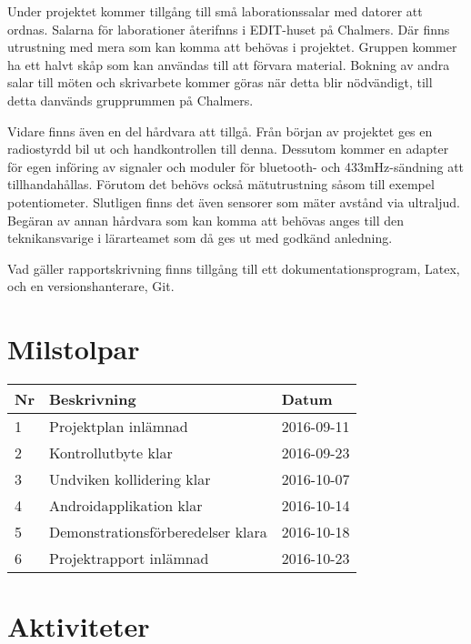 \documentclass[a4paper]{article}
\begin{document}
\vspace{5mm}
\noindent Under projektet kommer tillgång till små laborationssalar med datorer att ordnas. Salarna för laborationer återifnns i EDIT-huset på Chalmers. Där finns utrustning med mera som kan komma att behövas i projektet. Gruppen kommer ha ett halvt skåp som kan användas till att förvara material. Bokning av andra salar till möten och skrivarbete kommer göras när detta blir nödvändigt, till detta danvänds grupprummen på Chalmers.

Vidare finns även en del hårdvara att tillgå. Från början av projektet ges en radiostyrdd bil ut och handkontrollen till denna. Dessutom kommer en adapter för egen införing av signaler och moduler för bluetooth- och 433mHz-sändning att tillhandahållas. Förutom det behövs också mätutrustning såsom till exempel potentiometer. Slutligen finns det även sensorer som mäter avstånd via ultraljud. Begäran av annan hårdvara som kan komma att behövas anges till den teknikansvarige i lärarteamet som då ges ut med godkänd anledning.
 
Vad gäller rapportskrivning finns tillgång till ett dokumentationsprogram, Latex, och en versionshanterare, Git. 

\section{Milstolpar}

\begin{tabular}{|l|l|l|} \hline
\bf Nr & \bf Beskrivning & \bf Datum \\ \hline \hline
1 & Projektplan inlämnad & 2016-09-11 \\\hline
2 & Kontrollutbyte klar & 2016-09-23 \\ \hline
3 & Undviken kollidering klar & 2016-10-07 \\ \hline
4 & Androidapplikation klar & 2016-10-14 \\ \hline
5 & Demonstrationsförberedelser klara & 2016-10-18 \\ \hline
6 & Projektrapport inlämnad & 2016-10-23 \\ \hline

\end{tabular}

\section{Aktiviteter}
\end{document}
